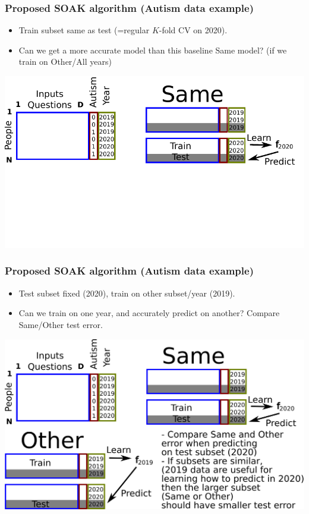 \documentclass[t]{beamer}
\begin{document}
\begin{frame}
  \frametitle{Proposed SOAK algorithm (Autism data example)}
  \begin{itemize}
  \item Train subset same as test (=regular $K$-fold CV on 2020).
    \item Can we get a more accurate model than this baseline Same model? (if we train on Other/All years)
  \end{itemize}
  \includegraphics[width=\textwidth]{drawing-cv-same-other-years-2.pdf}
\end{frame}

\begin{frame}
  \frametitle{Proposed SOAK algorithm (Autism data example)}
  \begin{itemize}
  \item Test subset fixed (2020), train on other subset/year (2019).
    \item Can we train on one year, and accurately predict on another? Compare Same/Other test error.
  \end{itemize}
  \includegraphics[width=\textwidth]{drawing-cv-same-other-years-ann}
\end{frame}
\end{document}
